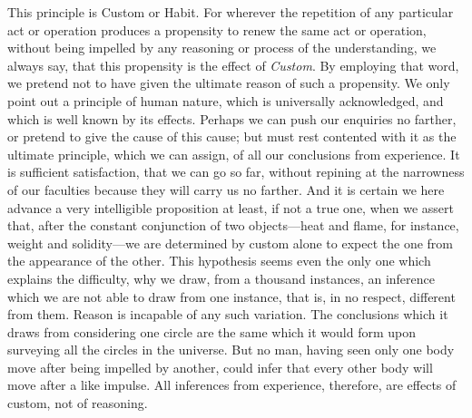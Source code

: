\documentclass[]{article}
\newcounter{authornote}[page]
\newcommand*{\authornote}[1]{\renewcommand{\thefootnote}{\fnsymbol{footnote}}\stepcounter{authornote}\footnote[\value{authornote}]{#1}\renewcommand{\thefootnote}{\arabic{footnote}}}
\begin{document}
\begin{sectionbody}
\humeparagraph  This principle is Custom or Habit. For wherever the repetition of any particular act or operation produces a propensity to renew the same act or operation, without being impelled by any reasoning or process of the understanding, we always say, that this propensity is the effect of \emph{Custom}. By employing that word, we pretend not to have given the ultimate reason of such a propensity. We only point out a principle of human nature, which is universally acknowledged, and which is well known by its effects. Perhaps we can push our enquiries no farther, or pretend to give the cause of this cause; but must rest contented with it as the ultimate principle, which we can assign, of all our conclusions from experience. It is sufficient satisfaction, that we can go so far, without repining at the narrowness of our faculties because they will carry us no farther. And it is certain we here advance a very intelligible proposition at least, if not a true one, when we assert that, after the constant conjunction of two objects---heat and flame, for instance, weight and solidity---we are determined by custom alone to expect the one from the appearance of the other. This hypothesis seems even the only one which explains the difficulty, why we draw, from a thousand instances, an inference which we are not able to draw from one instance, that is, in no respect, different from them. Reason is incapable of any such variation. The conclusions which it draws from considering one circle are the same which it would form upon surveying all the circles in the universe. But no man, having seen only one body move after being impelled by another, could infer that every other body will move after a like impulse. All inferences from experience, therefore, are effects of custom, not of reasoning.%
\end{sectionbody}
\end{document}
